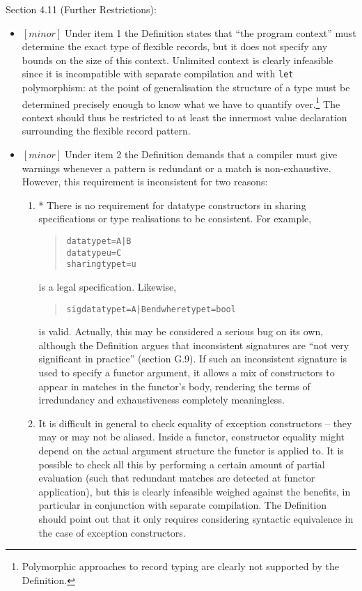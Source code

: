 \documentclass{article}
\newcommand{\m}[1]{$[\mathit{#1}]\;$}
\newcommand{\minor}{\m{minor}}
\begin{document}
Section 4.11 (Further Restrictions):
\nopagebreak

\begin{itemize}
\item \minor Under item 1 the Definition states that ``the program context'' must determine the exact type of flexible records, but it does not specify any bounds on the size of this context. Unlimited context is clearly infeasible since it is incompatible with separate compilation and with {\tt let} polymorphism: at the point of generalisation the structure of a type must be determined precisely enough to know what we have to quantify over.\footnote{Polymorphic approaches to record typing are clearly not supported by the Definition.} The context should thus be restricted to at least the innermost value declaration surrounding the flexible record pattern.

\item \minor Under item 2 the Definition demands that a compiler must give warnings whenever a pattern is redundant or a match is non-exhaustive. However, this requirement is inconsistent for two reasons:

\begin{enumerate}
\item * There is no requirement for datatype constructors in sharing specifications or type realisations to be consistent. For example,
\begin{quote}
\begin{alltt}
datatype t = A | B
datatype u = C
sharing type t = u
\end{alltt}
\end{quote}
is a legal specification. Likewise,
\begin{quote}
\begin{alltt}
sig datatype t = A | B end where type t = bool
\end{alltt}
\end{quote}
is valid. Actually, this may be considered a serious bug on its own, although the Definition argues that inconsistent signatures are ``not very significant in practice'' (section G.9). If such an inconsistent signature is used to specify a functor argument, it allows a mix of constructors to appear in matches in the functor's body, rendering the terms of irredundancy and exhaustiveness completely meaningless.

\item It is difficult in general to check equality of exception constructors -- they may or may not be aliased. Inside a functor, constructor equality might depend on the actual argument structure the functor is applied to. It is possible to check all this by performing a certain amount of partial evaluation (such that redundant matches are detected at functor application), but this is clearly infeasible weighed against the benefits, in particular in conjunction with separate compilation. The Definition should point out that it only requires considering syntactic equivalence in the case of exception constructors.
\end{enumerate}
\end{itemize}
\end{document}

